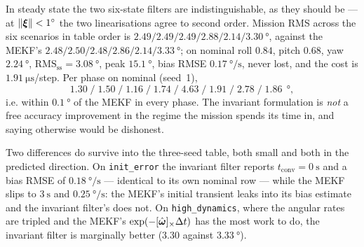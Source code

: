 In steady state the two six-state filters are indistinguishable, as they should be --- at
$\left\lVert \bm{\xi} \right\rVert<1^\circ$ the two linearisations agree to second order. Mission RMS across the six
scenarios in table order is $2.49/2.49/2.49/2.88/2.14/\SI{3.30}{\degree}$, against the MEKF's
$2.48/2.50/2.48/2.86/2.14/\SI{3.33}{\degree}$; on nominal roll $0.84$, pitch $0.68$, yaw
$\SI{2.24}{\degree}$, $\text{RMS}_{\text{ss}}=\SI{3.08}{\degree}$, peak $\SI{15.1}{\degree}$, bias
RMSE $\SI{0.17}{\degree\per\second}$, never lost, and the cost is
$\SI{1.91}{\micro\second}$/step. Per phase on nominal (seed~1),
\[
1.30\;/\;1.50\;/\;1.16\;/\;1.74\;/\;4.63\;/\;1.91\;/\;2.78\;/\;1.86\ \SI{}{\degree},
\]
i.e. within $\SI{0.1}{\degree}$ of the MEKF in every phase. The invariant formulation is \emph{not} a free accuracy improvement in the regime the
mission spends its time in, and saying otherwise would be dishonest.

Two differences do survive into the three-seed table, both small and both in the predicted
direction. On \texttt{init\_error} the invariant filter reports $t_{\text{conv}}=\SI{0}{\second}$
and a bias RMSE of $\SI{0.18}{\degree\per\second}$ --- identical to its own nominal row --- while the
MEKF slips to $\SI{3}{\second}$ and $\SI{0.25}{\degree\per\second}$: the MEKF's initial transient
leaks into its bias estimate and the invariant filter's does not. On \texttt{high\_dynamics}, where
the angular rates are tripled and the MEKF's $\exp(-[\hat{\bm{\omega}}]_\times\Delta t)$ has the most work
to do, the invariant filter is marginally better ($3.30$ against $\SI{3.33}{\degree}$).

